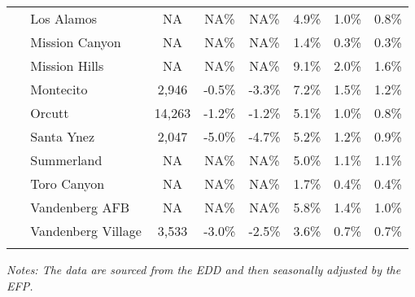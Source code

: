 \documentclass[12pt]{article}
\begin{document}
\begin{landscape}
\begin{table}
\begin{tabular}{|l|c|c|c||c|c|c|}
$\quad$ Los Alamos & NA & NA\% & NA\% & 4.9\% & 1.0\% & 0.8\% \\
$\quad$ Mission Canyon & NA & NA\% & NA\% & 1.4\% & 0.3\% & 0.3\% \\
$\quad$ Mission Hills & NA & NA\% & NA\% & 9.1\% & 2.0\% & 1.6\% \\
$\quad$ Montecito & 2,946 & -0.5\% & -3.3\% & 7.2\% & 1.5\% & 1.2\% \\
$\quad$ Orcutt & 14,263 & -1.2\% & -1.2\% & 5.1\% & 1.0\% & 0.8\% \\
$\quad$ Santa Ynez & 2,047 & -5.0\% & -4.7\% & 5.2\% & 1.2\% & 0.9\% \\
$\quad$ Summerland & NA & NA\% & NA\% & 5.0\% & 1.1\% & 1.1\% \\
$\quad$ Toro Canyon & NA & NA\% & NA\% & 1.7\% & 0.4\% & 0.4\% \\
$\quad$ Vandenberg AFB & NA & NA\% & NA\% & 5.8\% & 1.4\% & 1.0\% \\
$\quad$ Vandenberg Village & 3,533 & -3.0\% & -2.5\% & 3.6\% & 0.7\% & 0.7\% \\
&&&&&& \\ \hline \hline
\end{tabular}
\par
\vspace{.5em}
\footnotesize
\textit{Notes: The data are sourced from the EDD and then seasonally adjusted by the EFP.}
\end{table}
\end{landscape}
\end{document}
